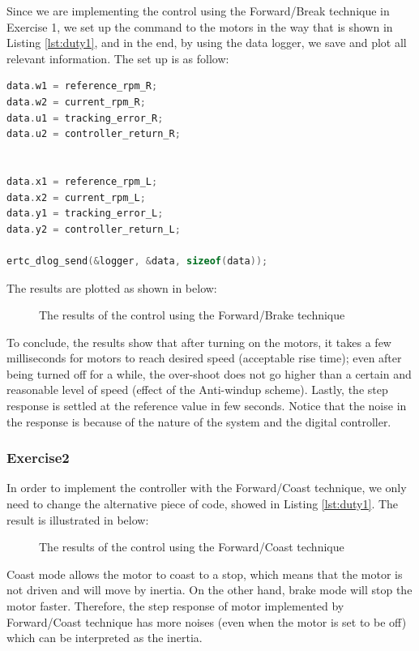 \documentclass[english]{article}
\begin{document}
\newpage
Since we are implementing the control using the Forward/Break 
technique in Exercise 1, we set up the command to the motors in
 the way that is shown in Listing \ref{lst:duty1}, and in the end,
  by using the data logger, we save and plot all relevant information.
   The set up is as follow: 
\begin{lstlisting}[language=C, caption={setting up data logger}, label={lst:date} ]
data.w1 = reference_rpm_R;
data.w2 = current_rpm_R;
data.u1 = tracking_error_R;
data.u2 = controller_return_R;


data.x1 = reference_rpm_L;
data.x2 = current_rpm_L;
data.y1 = tracking_error_L;
data.y2 = controller_return_L;

ertc_dlog_send(&logger, &data, sizeof(data));  
\end{lstlisting}
The results are plotted as shown in below:
\begin{figure}[tbh]
    \centering
    
    \caption{The results of the control using the Forward/Brake technique}
    \label{fig:b2}
\end{figure}
\newpage
To conclude, the results show that after turning on the motors, 
it takes a few milliseconds for motors to reach desired speed 
(acceptable rise time); even after being turned off for a while,
 the over-shoot does not go higher than a certain and reasonable
  level of speed (effect of the Anti-windup scheme). Lastly, the
   step response is settled at the reference value in few seconds.
    Notice that the noise in the response is because of the nature of
    the system and the digital controller. 
\subsubsection{Exercise2}
In order to implement the controller with the Forward/Coast 
technique, we only need to change the alternative piece of code,
 showed in Listing \ref{lst:duty1}. The result is illustrated in below: 
 \begin{figure}[tbh]
    \centering
    
    \caption{The results of the control using the Forward/Coast technique }
    \label{fig:b3}
\end{figure}\newline
Coast mode allows the motor to coast to a stop, which means that the motor 
is not driven and will move by inertia. On the other hand, brake mode will 
stop the motor faster. Therefore, the step response of motor implemented by
Forward/Coast technique has more noises (even when the motor is set to be off)
which can be interpreted as the inertia.  
\end{document}
